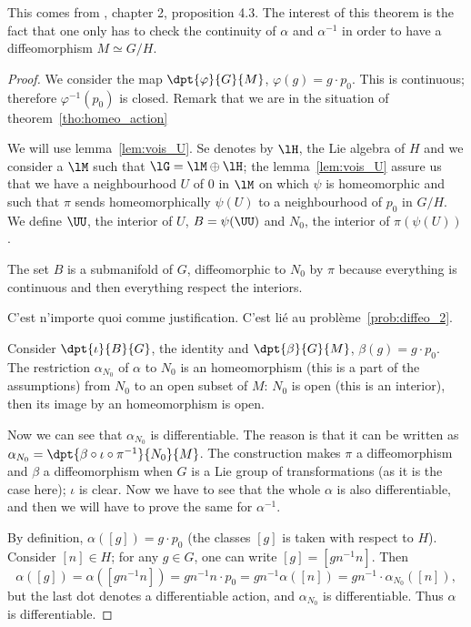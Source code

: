 This comes from \cite{Helgason}, chapter 2, proposition 4.3. The interest of this theorem is the fact that one only has to check the continuity of $\alpha$ and $\alpha^{-1}$ in order to have a diffeomorphism $M\simeq G/H$.

\begin{proof}
We consider the map $\dpt{\varphi}{G}{M}$, $\varphi(g)=g\cdot p_0$. This is continuous; therefore $\varphi^{-1}(p_0)$ is closed. Remark that we are in the situation of theorem~\ref{tho:homeo_action}

We will use lemma~\ref{lem:vois_U}. Se denotes by $\lH$, the Lie algebra of $H$ and we consider a $\lM$ such that $\lG=\lM\oplus\lH$; the lemma~\ref{lem:vois_U} assure us that we have a neighbourhood $U$ of $0$ in $\lM$ on which $\psi$ is homeomorphic and such that $\pi$ sends homeomorphically $\psi(U)$ to a neighbourhood of $p_0$ in $G/H$. We define $\UU$, the interior of $U$, $B=\psi(\UU)$ and $N_0$, the interior of $\pi(\psi(U))$.

The set $B$ is a submanifold of $G$, diffeomorphic to $N_0$ by $\pi$ because everything is continuous and then everything respect the interiors.

\begin{probleme}
C'est n'importe quoi comme justification. C'est lié au problème~\ref{prob:diffeo_2}.
\label{prob:diffeo_1}
\end{probleme}

Consider $\dpt{\iota}{B}{G}$, the identity and $\dpt{\beta}{G}{M}$, $\beta(g)=g\cdot p_0$. The restriction $\alpha_{N_0}$ of $\alpha$ to $N_0$ is an homeomorphism (this is a part of the assumptions) from $N_0$ to an open subset of $M$: $N_0$ is open (this is an interior), then its image by an homeomorphism is open.

Now we can see that $\alpha_{N_0}$ is differentiable. The reason is that it can be written as $\alpha_{N_0}=\dpt{\beta\circ\iota\circ\pi^{-1}}{N_0}{M}$. The construction makes $\pi$ a diffeomorphism and $\beta$ a diffeomorphism when $G$ is a Lie group of transformations (as it is the case here); $\iota$ is clear. Now we have to see that the whole $\alpha$ is also differentiable, and then we will have to prove the same for $\alpha^{-1}$.

By definition, $\alpha([g])=g\cdot p_0$ (the classes $[g]$ is taken with respect to $H$). Consider $[n]\in H$; for any $g\in G$, one can write $[g]=[gn^{-1} n]$. Then
\begin{equation}
  \alpha([g])=\alpha([gn^{-1} n])
             =gn^{-1} n\cdot p_0
	     =gn^{-1}\alpha([n])
	     =gn^{-1}\cdot\alpha_{N_0}([n]),
\end{equation}
but the last dot denotes a differentiable action, and $\alpha_{N_0}$ is differentiable. Thus $\alpha$ is differentiable.


\end{proof}
